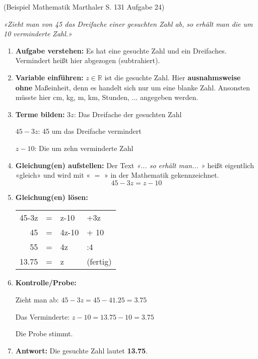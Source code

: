 



\usepackage{amssymb} 
\renewcommand{\metaHeaderLine}{Theorieblatt}
\renewcommand{\arbeitsblattTitel}{Systematisches Lösen von Textaufgaben}

\arbeitsblattHeader{}
(Beispiel Mathematik Marthaler S. 131 Aufgabe 24)

\textit{«Zieht man von 45 das Dreifache einer gesuchten Zahl ab, so
erhält man die um 10 verminderte Zahl.»}

\begin{enumerate}
\item \textbf{Aufgabe verstehen:} Es hat eine gesuchte Zahl und ein
Dreifaches. Vermindert heißt hier abgezogen (subtrahiert).

\item \textbf{Variable einführen:} $z\in \mathbb{R}$ ist die gesuchte
Zahl.
Hier \textbf{ausnahmsweise ohne} Maßeinheit, denn es handelt sich nur
um eine blanke Zahl. Ansonsten müsste hier cm, kg, m, km, Stunden,
... angegeben werden.

\item \textbf{Terme bilden:}
$3z$: Das Dreifache der gesuchten Zahl

$45-3z$: 45 um das Dreifache vermindert

$z-10$: Die um zehn verminderte Zahl

\item \textbf{Gleichung(en) aufstellen:} Der Text \textit{«... so
erhält man... »} heißt eigentlich «gleich» und wird mit « $=$ » in der
Mathematik gekennzeichnet.
$$45 - 3z = z - 10$$

\item \textbf{Gleichung(en) lösen:}

\begin{tabular}{rcl|l}

 45-3z &=& z-10 & +3z\\

 45 &=& 4z-10 & + 10 \\

 55 &=& 4z  & :4\\

  13.75 &=& z & (fertig)
 \end{tabular} 

\item \textbf{Kontrolle/Probe:}

Zieht man ab: $45-3z = 45-41.25 = 3.75$

Das Verminderte: $z-10 = 13.75 - 10 = 3.75$

Die Probe stimmt.

\item \textbf{Antwort:} Die gesuchte Zahl lautet \textbf{13.75}.

\end{enumerate}


